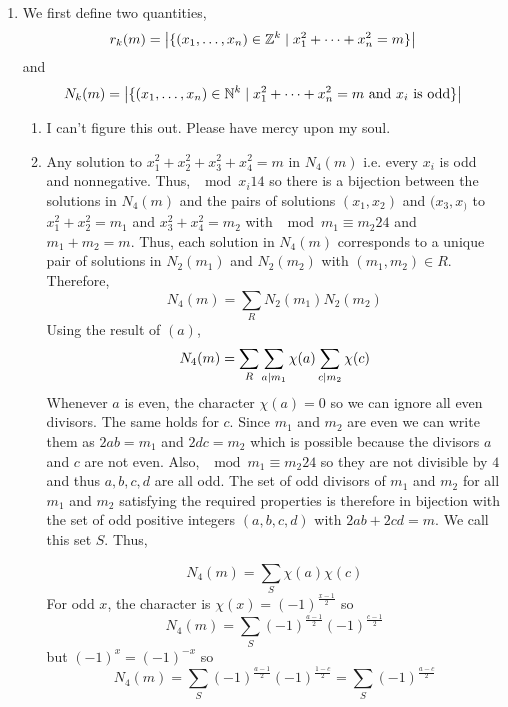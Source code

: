 \documentclass[12pt]{extarticle}
\begin{document}
 
\begin{enumerate}
\item We first define two quantities, 
\[r_k(m) = \big| \{(x_1, \dots, x_n) \in \mathbb{Z}^k \mid x_1^2 + \cdots + x_n^2 = m \} \big| \]
and
\[N_k(m) = \big| \{(x_1, \dots, x_n) \in \mathbb{N}^k \mid x_1^2 + \cdots + x_n^2 = m \text{ and } x_i \text{ is odd} \} \big| \]
\begin{enumerate}
\item I can't figure this out. Please have mercy upon my soul.     

\item Any solution to $x_1^2 + x_2^2 + x_3^2 + x_4^2 = m$ in $N_4(m)$ i.e. every $x_i$ is odd and nonnegative. Thus, $\mod{x_i}{1}{4}$ so there is a bijection between the solutions in $N_4(m)$ and the pairs of solutions $(x_1, x_2)$ and $(x_3, x_)$ to $x_1^2 + x_2^2 = m_1$ and $x_3^2 + x_4^2 = m_2$ with $\mod{m_1 \equiv m_2}{2}{4}$ and $m_1 + m_2 = m$. Thus, each solution in $N_4(m)$ corresponds to a unique pair of solutions in $N_2(m_1)$ and $N_2(m_2)$ with $(m_1, m_2) \in R$. Therefore,
\[N_4(m) = \sum_{R} N_2(m_1) N_2(m_2)\]
Using the result of $(a)$, 
\[N_4(m) = \sum_{R} \sum_{a \mid m_1} \chi(a) \sum_{c \mid m_2} \chi(c) \] 
Whenever $a$ is even, the character $\chi(a) = 0$ so we can ignore all even divisors. The same holds for $c$. Since $m_1$ and $m_2$ are even we can write them as $2ab = m_1$ and $2dc = m_2$ which is possible because the divisors $a$ and $c$ are not even. Also, $\mod{m_1 \equiv m_2}{2}{4}$ so they are not divisible by $4$ and thus $a,b,c,d$ are all odd. The set of odd divisors of $m_1$ and $m_2$ for all $m_1$ and $m_2$ satisfying the required properties is therefore in bijection with the set of odd positive integers $(a,b,c,d)$ with $2ab + 2cd = m$. We call this set $S$. Thus,

\[N_4(m) = \sum_{S} \chi(a) \chi(c) \] 
For odd $x$, the character is $\chi(x) = (-1)^{\frac{x-1}{2}}$ so
\[N_4(m) = \sum_{S} (-1)^{\frac{a-1}{2}} (-1)^{\frac{c-1}{2}} \]
but $(-1)^x = (-1)^{-x}$ so
\[N_4(m) = \sum_{S} (-1)^{\frac{a-1}{2}} (-1)^{\frac{1-c}{2}} =  \sum_{S} (-1)^{\frac{a-c}{2}} \]


\end{enumerate}
\end{enumerate}
\end{document}
